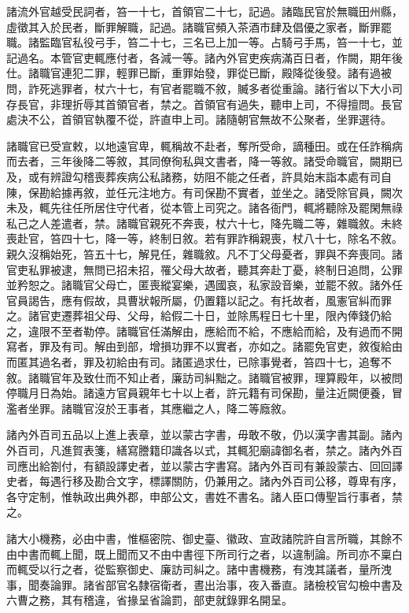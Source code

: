 \begin{pinyinscope}
 諸流外官越受民詞者，笞一十七，首領官二十七，記過。諸臨民官於無職田州縣，虛徵其入於民者，斷罪解職，記過。諸職官頻入茶酒市肆及倡優之家者，斷罪罷職。諸監臨官私役弓手，笞二十七，三名已上加一等。占騎弓手馬，笞一十七，並記過名。本管官吏輒應付者，各減一等。諸內外官吏疾病滿百日者，作闕，期年後仕。諸職官連犯二罪，輕罪已斷，重罪始發，罪從已斷，殿降從後發。諸有過被問，詐死逃罪者，杖六十七，有官者罷職不敘，贓多者從重論。諸行省以下大小司存長官，非理折辱其首領官者，禁之。首領官有過失，聽申上司，不得擅問。長官處決不公，首領官執覆不從，許直申上司。諸隨朝官無故不公聚者，坐罪選待。



 諸職官已受宣敕，以地遠官卑，輒稱故不赴者，奪所受命，謫種田。或在任詐稱病而去者，三年後降二等敘，其同僚徇私與文書者，降一等敘。諸受命職官，闕期已及，或有辨證勾稽喪葬疾病公私諸務，妨阻不能之任者，許具始末詣本處有司自陳，保勘給據再敘，並任元注地方。有司保勘不實者，並坐之。諸受除官員，闕次未及，輒先往任所居住守代者，從本管上司究之。諸各衙門，輒將聽除及罷閑無祿私己之人差遣者，禁。諸職官親死不奔喪，杖六十七，降先職二等，雜職敘。未終喪赴官，笞四十七，降一等，終制日敘。若有罪詐稱親喪，杖八十七，除名不敘。親久沒稱始死，笞五十七，解見任，雜職敘。凡不丁父母憂者，罪與不奔喪同。諸官吏私罪被逮，無問已招未招，罹父母大故者，聽其奔赴丁憂，終制日追問，公罪並矜恕之。諸職官父母亡，匿喪縱宴樂，遇國哀，私家設音樂，並罷不敘。諸外任官員謁告，應有假故，具曹狀報所屬，仍置籍以記之。有托故者，風憲官糾而罪之。諸官吏遷葬祖父母、父母，給假二十日，並除馬程日七十里，限內俸錢仍給之，違限不至者勒停。諸職官任滿解由，應給而不給，不應給而給，及有過而不開寫者，罪及有司。解由到部，增損功罪不以實者，亦如之。諸罷免官吏，敘復給由而匿其過名者，罪及初給由有司。諸匿過求仕，已除事覺者，笞四十七，追奪不敘。諸職官年及致仕而不知止者，廉訪司糾黜之。諸職官被罪，理算殿年，以被問停職月日為始。諸遠方官員親年七十以上者，許元籍有司保勘，量注近闕便養，冒濫者坐罪。諸職官沒於王事者，其應繼之人，降二等廕敘。



 諸內外百司五品以上進上表章，並以蒙古字書，毋敢不敬，仍以漢字書其副。諸內外百司，凡進賀表箋，繕寫謄籍印識各以式，其輒犯廟諱御名者，禁之。諸內外百司應出給劄付，有額設譯史者，並以蒙古字書寫。諸內外百司有兼設蒙古、回回譯史者，每遇行移及勘合文字，標譯關防，仍兼用之。諸內外百司公移，尊卑有序，各守定制，惟執政出典外郡，申部公文，書姓不書名。諸人臣口傳聖旨行事者，禁之。



 諸大小機務，必由中書，惟樞密院、御史臺、徽政、宣政諸院許自言所職，其餘不由中書而輒上聞，既上聞而又不由中書徑下所司行之者，以違制論。所司亦不稟白而輒受以行之者，從監察御史、廉訪司糾之。諸中書機務，有洩其議者，量所洩事，聞奏論罪。諸省部官名隸宿衛者，晝出治事，夜入番直。諸檢校官勾檢中書及六曹之務，其有稽違，省掾呈省論罰，部吏就錄罪名開呈。




\end{pinyinscope}
